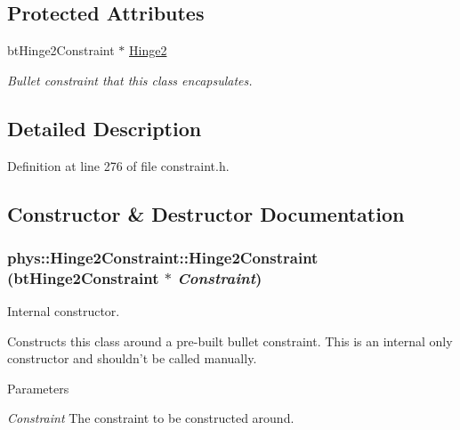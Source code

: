 \subsection*{Protected Attributes}
\begin{DoxyCompactItemize}
\item 
\hypertarget{classphys_1_1Hinge2Constraint_aa32c384f4c51895001e4378342d8f45e}{
btHinge2Constraint $\ast$ \hyperlink{classphys_1_1Hinge2Constraint_aa32c384f4c51895001e4378342d8f45e}{Hinge2}}
\label{d2/d16/classphys_1_1Hinge2Constraint_aa32c384f4c51895001e4378342d8f45e}

\begin{DoxyCompactList}\small\item\em Bullet constraint that this class encapsulates. \item\end{DoxyCompactList}\end{DoxyCompactItemize}


\subsection{Detailed Description}


Definition at line 276 of file constraint.h.



\subsection{Constructor \& Destructor Documentation}
\hypertarget{classphys_1_1Hinge2Constraint_aaf937ddb299b8b47e243e83dfd585e44}{
\subsubsection[{Hinge2Constraint}]{\setlength{\rightskip}{0pt plus 5cm}phys::Hinge2Constraint::Hinge2Constraint (btHinge2Constraint $\ast$ {\em Constraint})}}
\label{d2/d16/classphys_1_1Hinge2Constraint_aaf937ddb299b8b47e243e83dfd585e44}


Internal constructor. 

Constructs this class around a pre-\/built bullet constraint. This is an internal only constructor and shouldn't be called manually. 
\begin{DoxyParams}{Parameters}
\item[{\em Constraint}]The constraint to be constructed around. \end{DoxyParams}


